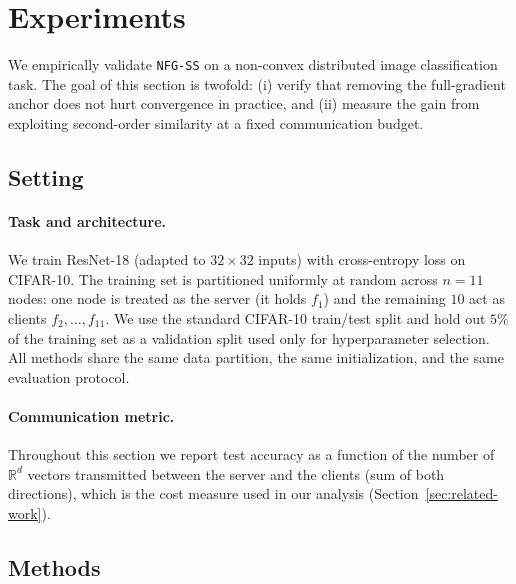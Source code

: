 
\section{Experiments}
\label{sec:experiments}

We empirically validate \texttt{NFG-SS} on a non-convex distributed image
classification task. The goal of this section is twofold: (i) verify
that removing the full-gradient anchor does not hurt convergence in
practice, and (ii) measure the gain from exploiting second-order
similarity at a fixed communication budget.

\subsection{Setting}
\label{sec:exp-setup}

\paragraph{Task and architecture.} We train ResNet-18 (adapted to
$32{\times}32$ inputs) with cross-entropy loss on CIFAR-10. The
training set is partitioned uniformly at random across $n=11$ nodes:
one node is treated as the server (it holds $f_1$) and the remaining
$10$ act as clients $f_2,\dots,f_{11}$. We use the standard CIFAR-10
train/test split and hold out $5\%$ of the training set as a
validation split used only for hyperparameter selection. All methods
share the same data partition, the same initialization, and the same
evaluation protocol.

\paragraph{Communication metric.} Throughout this section we report
test accuracy as a function of the number of $\mathbb{R}^d$ vectors
transmitted between the server and the clients (sum of both
directions), which is the cost measure used in our analysis
(Section~\ref{sec:related-work}).

\subsection{Methods}
\label{sec:exp-methods}

